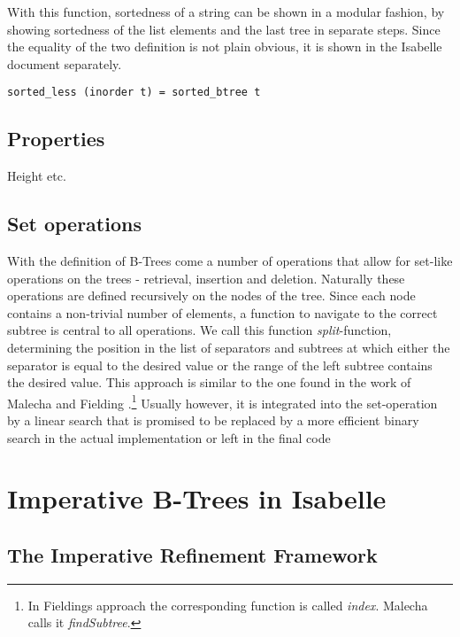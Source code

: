 With this function, sortedness of a string can be shown in a modular fashion,
by showing sortedness of the list elements and the last tree in separate steps.
Since the equality of the two definition is not plain obvious,
it is shown in the Isabelle document separately.

\begin{lemma}
    \texttt{sorted\_less (inorder t) = sorted\_btree t}
\end{lemma}


\section{Properties}

Height etc.


\section{Set operations}

With the definition of B-Trees come a number of operations that allow for set-like operations
on the trees - retrieval, insertion and deletion.
Naturally these operations are defined recursively on the nodes of the tree.
Since each node contains a non-trivial number of elements,
a function to navigate to the correct subtree is central to all operations.
We call this function \textit{split}-function,
determining the position in the list of separators and subtrees at which
either the separator is equal to the desired value or the range of the left subtree
contains the desired value.
This approach is similar to the one found in the work of Malecha and Fielding \parencite{DBLP:conf/popl/MalechaMSW10,Fielding80}.\footnote{
    In Fieldings approach the corresponding function is called \textit{index}.
    Malecha calls it \textit{findSubtree}.
}
Usually however, it is integrated into the set-operation
by a linear search that is promised to be replaced by a more efficient binary search
in the actual implementation \parencite{DBLP:books/daglib/0023376,DBLP:journals/acta/BayerM72}
or left in the final code \parencite{DBLP:journals/sosym/ErnstSR15}



\chapter{Imperative B-Trees in Isabelle}

\section{The Imperative Refinement Framework}


